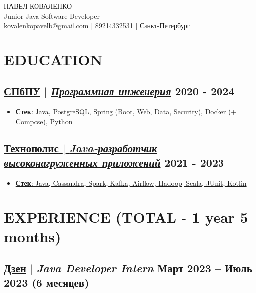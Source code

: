 \documentclass[11pt]{article}
\begin{document}
\begin{center}
    {\fontsize{36}{36}\selectfont ПАВЕЛ КОВАЛЕНКО} \\ \bigskip
    {\fontsize{25}{25}\selectfont Junior Java Software Developer} \\ \bigskip
    {\color{icnclr}\faEnvelope[email]} \href{mailto:kovalenkopavelb@gmail.com}{kovalenkopavelb@gmail.com} $|$ 
    {\color{icnclr}} 89214332531 $|$
    {\color{icnclr}\faMapMarker} Санкт-Петербург
\end{center}

\section{EDUCATION}
\subsection{\href{https://www.spbstu.ru/}{\underline{СПбПУ}} $|$ {\normalfont\textit{\href{https://www.spbstu.ru/structure/graduate_school_software_engineering/}{\underline{Программная инженерия}}}} \hfill 2020 - 2024}
\begin{itemize}
    \item \underline{\textbf{Стек}: Java, PostgreSQL, Spring (Boot, Web, Data, Security), Docker (+ Compose), Python}
\end{itemize}

\subsection{\href{https://polis.vk.company/}{\underline{Технополис} $|$ {\normalfont\textit{\underline{Java-разработчик высоконагруженных приложений}}}} \hfill 2021 - 2023}
\begin{itemize}
    \item \underline{\textbf{Стек}: Java, Cassandra, Spark, Kafka, Airflow, Hadoop, Scala, JUnit, Kotlin}
\end{itemize}

\section{EXPERIENCE (TOTAL - 1 year 5 months)}
\subsection{\href{https://dzen.ru}{\underline{Дзен}} $|$ {\normalfont\textit{Java Developer Intern}} \hfill Март 2023 -- Июль 2023 (6 месяцев)}
\end{document}
